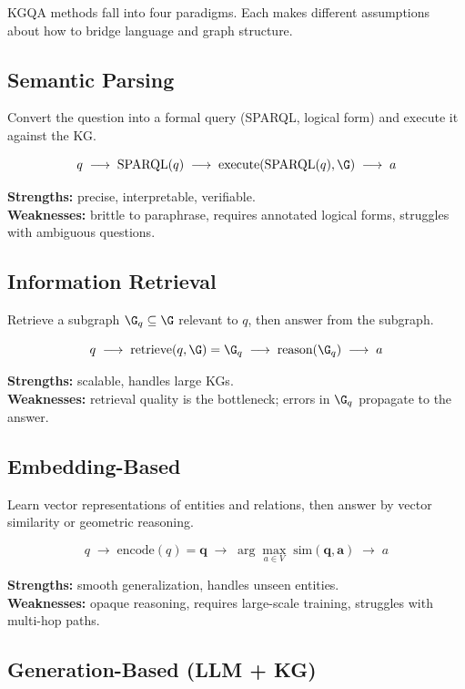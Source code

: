 \documentclass[11pt,a4paper]{article}
\begin{document}
KGQA methods fall into four paradigms.  Each makes different assumptions
about how to bridge language and graph structure.

\subsection{Semantic Parsing}

Convert the question into a formal query (SPARQL, logical form) and
execute it against the KG.

\[
  q \;\longrightarrow\; \text{SPARQL}(q) \;\longrightarrow\;
  \text{execute}(\text{SPARQL}(q), \G) \;\longrightarrow\; a
\]

\textbf{Strengths:} precise, interpretable, verifiable.\\
\textbf{Weaknesses:} brittle to paraphrase, requires annotated
logical forms, struggles with ambiguous questions.

\subsection{Information Retrieval}

Retrieve a subgraph $\G_q \subseteq \G$ relevant to $q$, then answer
from the subgraph.

\[
  q \;\longrightarrow\; \text{retrieve}(q, \G) = \G_q
  \;\longrightarrow\; \text{reason}(\G_q) \;\longrightarrow\; a
\]

\textbf{Strengths:} scalable, handles large KGs.\\
\textbf{Weaknesses:} retrieval quality is the bottleneck; errors in
$\G_q$ propagate to the answer.

\subsection{Embedding-Based}

Learn vector representations of entities and relations, then answer by
vector similarity or geometric reasoning.

\[
  q \;\longrightarrow\; \text{encode}(q) = \mathbf{q}
  \;\longrightarrow\; \arg\max_{a \in V}\;
  \text{sim}(\mathbf{q}, \mathbf{a}) \;\longrightarrow\; a
\]

\textbf{Strengths:} smooth generalization, handles unseen entities.\\
\textbf{Weaknesses:} opaque reasoning, requires large-scale training,
struggles with multi-hop paths.

\subsection{Generation-Based (LLM + KG)}
\end{document}
